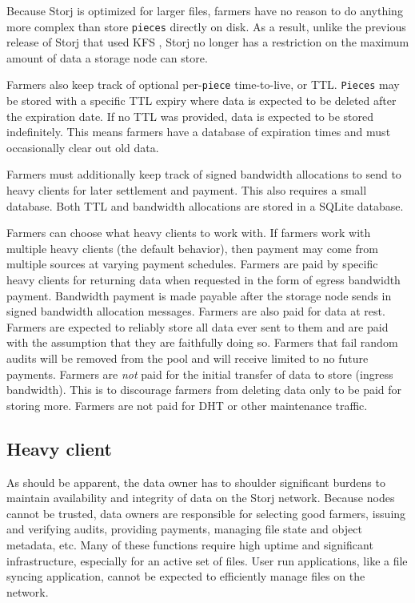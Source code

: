 \documentclass[a4paper,10pt]{article} \usepackage[utf8]{inputenc}
\newcommand{\x}[1]{{\tt #1}} \newcommand{\code}[1]{{\tt #1}}
\begin{document}
Because Storj is optimized for larger files, farmers have no reason to do
anything more complex than store \x{pieces} directly on disk. As a result,
unlike the previous release of Storj that used KFS \cite{storj-v2}, Storj no
longer has a restriction on the maximum amount of data a storage node can store.

Farmers also keep track of optional per-\x{piece} time-to-live, or TTL.
\x{Pieces} may be stored with a specific TTL expiry where data is expected to
be deleted after the expiration date. If no TTL was provided, data is expected
to be stored indefinitely. This means farmers have a database of expiration
times and must occasionally clear out old data.

Farmers must additionally keep track of signed bandwidth allocations to send to
heavy clients for later settlement and payment. This also requires a small
database. Both TTL and bandwidth allocations are stored in a SQLite
\cite{sqlite} database.

Farmers can choose what heavy clients to work with. If farmers work with
multiple heavy clients (the default behavior), then payment may come from
multiple sources at varying payment schedules.
Farmers are paid by specific heavy clients for returning data when requested in
the form of egress bandwidth payment. Bandwidth payment is made payable after
the storage node sends in signed bandwidth allocation messages.
Farmers are also paid for data at rest.
Farmers are expected to reliably store all data ever sent to them and are paid
with the assumption that they are faithfully doing so.
Farmers that fail random audits will be removed from the pool and will receive
limited to no future payments.
Farmers are {\em not} paid for the initial transfer of data to store (ingress
bandwidth). This is to discourage farmers from deleting data only to be paid for
storing more. Farmers are not paid for DHT or other maintenance traffic.

\subsection{Heavy client}

As should be apparent, the data owner has to shoulder significant burdens
to maintain availability and integrity of data on the Storj network. Because
nodes cannot be trusted, data owners are responsible for selecting good
farmers, issuing and verifying audits, providing payments, managing file state
and object metadata, etc. Many of these functions require high uptime and
significant infrastructure, especially for an active set of files. User run
applications, like a file syncing application, cannot be expected to efficiently
manage files on the network.
\end{document}
